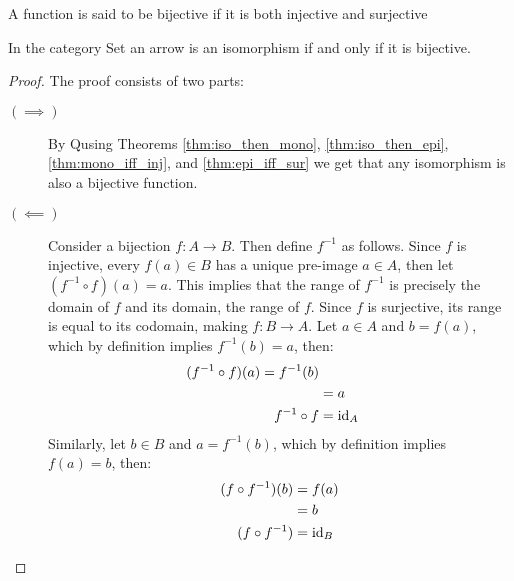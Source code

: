 \begin{definition}
  A function is said to be bijective if it is both injective and surjective
\end{definition}

\begin{theorem}
  In the category Set an arrow is an isomorphism if and only if it is
  bijective.

  \begin{proof}
    The proof consists of two parts:

    \begin{description}
      \item[$(\implies)$] By Qusing Theorems \ref{thm:iso_then_mono},
        \ref{thm:iso_then_epi}, \ref{thm:mono_iff_inj}, and
        \ref{thm:epi_iff_sur} we get that any isomorphism is also a bijective
        function.
      \item[$(\impliedby)$] Consider a bijection $f:A\to B$. Then define
        $f^{-1}$ as follows. Since $f$ is injective, every $f(a)\in B$ has a
        unique pre-image $a\in A$, then let $(f^{-1}\circ f)(a) = a$. This
        implies that the range of $f^{-1}$ is precisely the domain of $f$ and
        its domain, the range of $f$. Since $f$ is surjective, its range is
        equal to its codomain, making $f:B\to A$. Let $a\in A$ and $b=f(a)$,
        which by definition implies $f^{-1}(b)=a$, then:
        \[
          \begin{aligned}
            (f^{-1}\circ f)(a)
            = f^{-1}(b)\\
            &= a\\
            f^{-1}\circ f &= \mathrm{id}_A
          \end{aligned}
        \]
        Similarly, let $b\in B$ and $a=f^{-1}(b)$, which by definition implies
        $f(a)=b$, then:
        \[
          \begin{aligned}
            (f\circ f^{-1})(b)
            &= f(a)\\
            &= b\\
            (f\circ f^{-1}) &= \mathrm{id}_B
          \end{aligned}
        \]\qedhere
    \end{description}
  \end{proof}
\end{theorem}